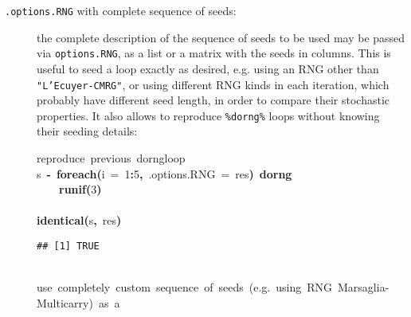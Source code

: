 \documentclass[a4paper,12pt]{article}\usepackage{graphicx, color}
\makeatletter
\newcommand{\hlnumber}[1]{\textcolor[rgb]{0,0,0}{#1}}%
\newcommand{\hlfunctioncall}[1]{\textcolor[rgb]{0.501960784313725,0,0.329411764705882}{\textbf{#1}}}%
\newcommand{\hlkeyword}[1]{\textcolor[rgb]{0,0,0}{\textbf{#1}}}%
\newcommand{\hlargument}[1]{\textcolor[rgb]{0.690196078431373,0.250980392156863,0.0196078431372549}{#1}}%
\newcommand{\hlcomment}[1]{\textcolor[rgb]{0.180392156862745,0.6,0.341176470588235}{#1}}%
\newcommand{\hlassignement}[1]{\textcolor[rgb]{0,0,0}{\textbf{#1}}}%
\newcommand{\hlsymbol}[1]{\textcolor[rgb]{0,0,0}{#1}}%
\newcommand{\hlstd}[1]{\textcolor[rgb]{0,0,0}{#1}}%
\newenvironment{kframe}{%
 \def\FrameCommand##1{\hskip\@totalleftmargin \hskip-\fboxsep
 \colorbox{shadecolor}{##1}\hskip-\fboxsep
     \hskip-\linewidth \hskip-\@totalleftmargin \hskip\columnwidth}%
 \MakeFramed {\advance\hsize-\width
   \@totalleftmargin\z@ \linewidth\hsize
   \@setminipage}}%
 {\par\unskip\endMakeFramed}
\newenvironment{knitrout}{}{} %
\renewenvironment{knitrout}{\begin{footnotesize}}{\end{footnotesize}}
\let\code=\texttt
\makeatother
\begin{document}
\begin{description}
\item[\code{.options.RNG} with complete sequence of seeds:] the complete
description of the sequence of seeds to be used may be
passed via \code{options.RNG}, as a list or a matrix with the seeds in columns.
This is useful to seed a loop exactly as desired, e.g. using an RNG
other than \code{"L'Ecuyer-CMRG"}, or using different RNG kinds in each iteration, which probably have different seed
length, in order to compare their stochastic properties.
It also allows to reproduce \code{\%dorng\%} loops without knowing their seeding
details:

\begin{knitrout}
\color{fgcolor}\begin{kframe}
\begin{flushleft}
\ttfamily\noindent
\hlcomment{\usebox{\hlnormalsizeboxhash}{\ }reproduce{\ }previous{\ }\usebox{\hlnormalsizeboxpercent}dorng\usebox{\hlnormalsizeboxpercent}{\ }loop}\hspace*{\fill}\\
\hlstd{}\hlsymbol{s}{\ }\hlassignement{\usebox{\hlnormalsizeboxlessthan}-}{\ }\hlfunctioncall{foreach}\hlkeyword{(}\hlargument{i}{\ }\hlargument{=}{\ }\hlnumber{1}\hlkeyword{:}\hlnumber{5}\hlkeyword{,}{\ }\hlargument{.options.RNG}{\ }\hlargument{=}{\ }\hlsymbol{res}\hlkeyword{)}{\ }\hlkeyword{\usebox{\hlnormalsizeboxpercent}dorng\usebox{\hlnormalsizeboxpercent}}{\ }\hlkeyword{\usebox{\hlnormalsizeboxopenbrace}}\hspace*{\fill}\\
\hlstd{}{\ }{\ }{\ }{\ }\hlfunctioncall{runif}\hlkeyword{(}\hlnumber{3}\hlkeyword{)}\hspace*{\fill}\\
\hlstd{}\hlkeyword{\usebox{\hlnormalsizeboxclosebrace}}\hspace*{\fill}\\
\hlstd{}\hlfunctioncall{identical}\hlkeyword{(}\hlsymbol{s}\hlkeyword{,}{\ }\hlsymbol{res}\hlkeyword{)}\mbox{}
\normalfont
\end{flushleft}
\begin{verbatim}
## [1] TRUE
\end{verbatim}
\begin{flushleft}
\ttfamily\noindent
\hspace*{\fill}\\
\hlstd{}\hlcomment{\usebox{\hlnormalsizeboxhash}\usebox{\hlnormalsizeboxhash}{\ }use{\ }completely{\ }custom{\ }sequence{\ }of{\ }seeds{\ }(e.g.{\ }using{\ }RNG{\ }\usebox{\hlnormalsizeboxsinglequote}Marsaglia-Multicarry\usebox{\hlnormalsizeboxsinglequote}){\ }as{\ }a}\hspace*{\fill}\\

\end{flushleft}
\end{kframe}
\end{knitrout}
\end{description}
\end{document}
